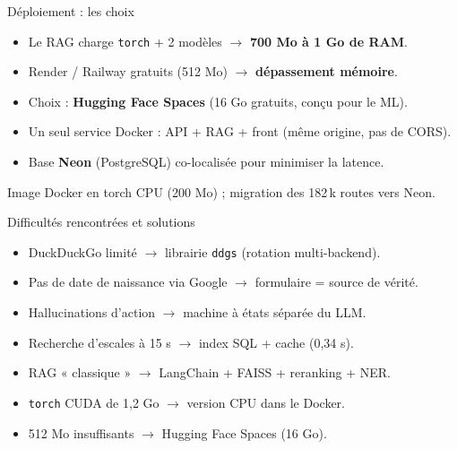 \documentclass[aspectratio=169,11pt]{beamer}
\newcommand{\code}[1]{\texttt{\small #1}}
\newcommand{\hl}[1]{\textbf{\color{accent}#1}}
\begin{document}
\begin{frame}{Déploiement : les choix}
  \begin{itemize}
    \item Le RAG charge \code{torch} + 2 modèles $\rightarrow$ \hl{700 Mo à 1 Go de RAM}.
    \item Render / Railway gratuits (512 Mo) $\rightarrow$ \hl{dépassement mémoire}.
    \item Choix : \hl{Hugging Face Spaces} (16 Go gratuits, conçu pour le ML).
    \item Un seul service Docker : API + RAG + front (même origine, pas de CORS).
    \item Base \hl{Neon} (PostgreSQL) co-localisée pour minimiser la latence.
  \end{itemize}
  \vfill
  \begin{center}\small\color{soft}
    Image Docker en torch CPU (200 Mo) ; migration des 182\,k routes vers Neon.
  \end{center}
\end{frame}

\begin{frame}{Difficultés rencontrées et solutions}
  \begin{itemize}\small
    \item DuckDuckGo limité $\rightarrow$ librairie \code{ddgs} (rotation multi-backend).
    \item Pas de date de naissance via Google $\rightarrow$ formulaire = source de vérité.
    \item Hallucinations d'action $\rightarrow$ machine à états séparée du LLM.
    \item Recherche d'escales à 15 s $\rightarrow$ index SQL + cache (0,34 s).
    \item RAG « classique » $\rightarrow$ LangChain + FAISS + reranking + NER.
    \item \code{torch} CUDA de 1,2 Go $\rightarrow$ version CPU dans le Docker.
    \item 512 Mo insuffisants $\rightarrow$ Hugging Face Spaces (16 Go).
  \end{itemize}
\end{frame}
\end{document}
